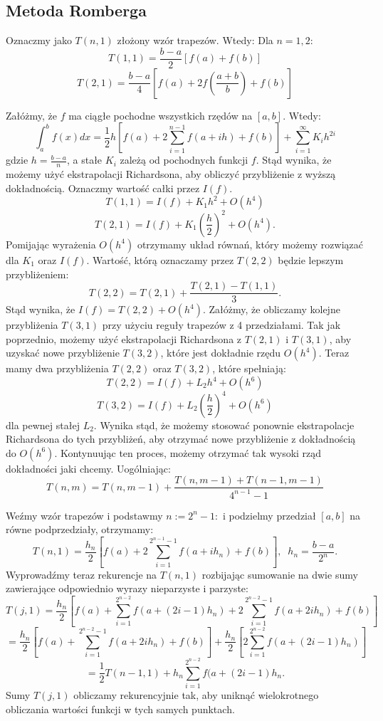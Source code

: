 \documentclass[12p]{article}
\begin{document}
\subsection{Metoda Romberga}

Oznaczmy jako $T(n,1)$ złożony wzór trapezów. Wtedy:
Dla $n=1,2$:
\[ T(1,1) = \frac{b-a}{2} [f(a) + f(b)] \]
\[ T(2,1) = \frac{b-a}{4} [f(a) + 2f(\frac{a+b}{b})+f(b)] \]

Załóżmy, że $f$ ma ciągłe pochodne wszystkich rzędów na $[a,b]$. Wtedy: 
\[ \int_{a}^{b} f(x)dx  = \frac{1}{2}h[f(a)+ 2\sum_{i=1}^{n-1}f(a+ih)+f(b)] + \sum_{i=1}^{\infty}K_{i}h^{2i} \]
gdzie $h = \frac{b-a}{n}$, a stałe $K_{i}$ zależą od pochodnych funkcji $f$. Stąd wynika, że możemy użyć ekstrapolacji Richardsona, aby obliczyć przybliżenie z wyższą dokładnością. Oznaczmy wartość całki przez $I(f)$.
\[ T(1,1) = I(f) + K_{1}h^2 + O(h^4)\]
\[ T(2,1) = I(f) + K_{1}(\frac{h}{2})^2 + O(h^4).\]
Pomijając wyrażenia $O(h^4)$ otrzymamy układ równań, który możemy rozwiązać dla $K_{1}$ oraz $I(f)$. Wartość, którą oznaczamy przez $T(2,2)$ będzie lepszym przybliżeniem:
\[ T(2,2)= T(2,1) + \frac{T(2,1)-T(1,1)}{3}.\]
Stąd wynika, że $I(f) = T(2,2) + O(h^4)$.
Załóżmy, że obliczamy kolejne przybliżenia $T(3,1)$ przy użyciu reguły trapezów z 4 przedziałami. Tak jak poprzednio, możemy użyć ekstrapolacji Richardsona z $T(2,1) $ i $ T(3,1)$, aby uzyskać nowe przybliżenie $T(3,2)$, które jest dokładnie rzędu $O(h^4)$. Teraz mamy dwa przybliżenia $T(2,2) $ oraz $T(3,2)$, które spełniają:
\[ T(2,2) = I(f)+ L_{2}h^4+O(h^6)\]
\[ T(3,2) = I(f)+ L_{2}(\frac{h}{2})^4+O(h^6)\]
dla pewnej stałej $L_{2}$. Wynika stąd, że możemy stosować ponownie ekstrapolacje Richardsona do tych przybliżeń, aby otrzymać nowe przybliżenie z dokładnością do $O(h^6)$. Kontynuując ten proces, możemy otrzymać tak wysoki rząd dokładności jaki chcemy. Uogólniając:
\[ T(n,m) = T(n,m-1) + \frac{T(n,m-1)+T(n-1,m-1)}{4^{n-1}-1}\]


Weźmy wzór trapezów i podstawmy $ n:= 2^n-1:$ i podzielmy przedział $[a,b]$ na równe podprzedziały, otrzymamy:
\[ T(n,1) = \frac{h_n}{2} [f(a) + 2 \sum_{i=1}^{2^{n - 1} -1}f(a+ih_{n})+f(b)], \;\; h_{n} = \frac{b-a}{2^n} .\]
Wyprowadźmy teraz rekurencje na $T(n,1)$ rozbijając sumowanie na dwie sumy zawierające odpowiednio wyrazy nieparzyste 	i parzyste:
\[ T(j,1) = \frac{h_{n}}{2}[f(a)+ \sum_{i=1}^{2^{n-2}}f(a+(2i-1)h_{n})+2 \sum_{i=1}^{2^{n-2}-1}f(a+2ih_{n})+f(b)]\]
\[= \frac{h_{n}}{2}[f(a)+ \sum_{i=1}^{2^{n-2}-1}f(a+2ih_{n})+f(b)]+ \frac{h_{n}}{2} [2\sum_{i=1}^{2^{n-2}}f(a+(2i-1)h_{n})] \]
\[ = \frac{1}{2}T(n-1,1) + h_{n} \sum_{i=1}^{2^{n-2}}f(a+(2i-1)h_{n}.\]
Sumy $T(j,1)$ obliczamy rekurencyjnie tak, aby uniknąć wielokrotnego obliczania wartości funkcji w tych samych punktach.\newpage
\end{document}

